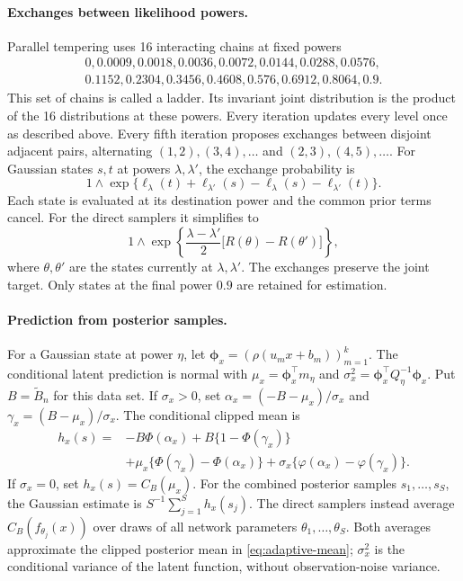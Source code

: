\documentclass[11pt,a4paper]{article}
\theoremstyle{remark}
\begin{document}
\paragraph{Exchanges between likelihood powers.}
Parallel tempering \citep{jasra2007} uses 16 interacting chains at fixed powers
\[
\begin{gathered}
0,0.0009,0.0018,0.0036,0.0072,0.0144,0.0288,0.0576,
\\
0.1152,0.2304,0.3456,0.4608,0.576,0.6912,0.8064,0.9.
\end{gathered}
\]
This set of chains is called a ladder. Its invariant joint
distribution is the product of the 16 distributions at these powers. Every iteration updates every level once
as described above. Every fifth iteration proposes exchanges
between disjoint adjacent pairs, alternating
$(1,2),(3,4),\ldots$ and $(2,3),(4,5),\ldots$.
For {Gaussian states} $s,t$ at powers $\lambda,\lambda'$, the
exchange probability is
\[
1\wedge\exp\{\ell_\lambda(t)+\ell_{\lambda'}(s)
-\ell_\lambda(s)-\ell_{\lambda'}(t)\}.
\]
Each state is evaluated at its destination power and the common
prior terms cancel. For the direct samplers it simplifies to
\[
1\wedge\exp\left\{\frac{\lambda-\lambda'}2
\bigl[R(\theta)-R(\theta')\bigr]\right\},
\]
where $\theta,\theta'$ are the states currently at
$\lambda,\lambda'$. The exchanges preserve the joint target.
Only states at the final power $0.9$ are retained for estimation.

\paragraph{Prediction from posterior samples.}
For a {Gaussian state} at power $\eta$, let
$\boldsymbol\phi_x=(\rho(u_mx+b_m))_{m=1}^k$.
The conditional latent prediction is normal with
$\mu_x=\boldsymbol\phi_x^\top m_\eta$ and
$\sigma_x^2=\boldsymbol\phi_x^\top Q_\eta^{-1}\boldsymbol\phi_x$.
Put $B=\widetilde B_n$ for this data set.
If $\sigma_x>0$, set
$\alpha_x=(-B-\mu_x)/\sigma_x$ and
$\gamma_x=(B-\mu_x)/\sigma_x$. The conditional clipped mean is
\begin{equation}\label{eq:simulation-clipped-normal}
\begin{split}
h_x(s)={}&-B\Phi(\alpha_x)+B\{1-\Phi(\gamma_x)\}\\
&+\mu_x\{\Phi(\gamma_x)-\Phi(\alpha_x)\}
+\sigma_x\{\varphi(\alpha_x)-\varphi(\gamma_x)\}.
\end{split}
\end{equation}
If $\sigma_x=0$, set $h_x(s)=C_B(\mu_x)$.
For the combined posterior samples $s_1,\ldots,s_S$, the Gaussian estimate
is $S^{-1}\sum_{j=1}^S h_x(s_j)$. The direct samplers instead
average $C_B(f_{\theta_j}(x))$ over draws of all network parameters
$\theta_1,\ldots,\theta_S$.
Both averages approximate the clipped posterior mean in
\eqref{eq:adaptive-mean}; $\sigma_x^2$ is the conditional variance
of the latent function, without observation-noise variance.
\end{document}
